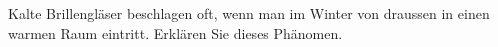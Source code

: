 Kalte Brillengläser beschlagen oft, wenn man im Winter von draussen in einen warmen Raum eintritt. Erklären Sie dieses Phänomen.
